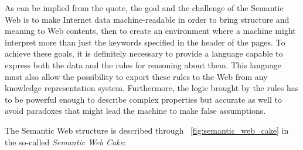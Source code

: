 \documentclass[10pt, a4paper]{report}
\begin{document}
As can be implied from the quote, the goal and the challenge of the Semantic Web is to make Internet data machine-readable in order to bring structure and meaning to Web contents, then to create an environment where a machine might interpret more than just the keywords specified in the header of the pages. To achieve these goals, it is definitely necessary to provide a language capable to express both the data and the rules for reasoning about them. This language must also allow the possibility to export these rules to the Web from any knowledge representation system. Furthermore, the logic brought by the rules has to be powerful enough to describe complex properties but accurate as well to avoid paradoxes that might lead the machine to make false assumptions.

The Semantic Web structure is described through \figurename~\ref{fig:semantic_web_cake} in the so-called \textit{Semantic Web Cake}: \\
\end{document}
